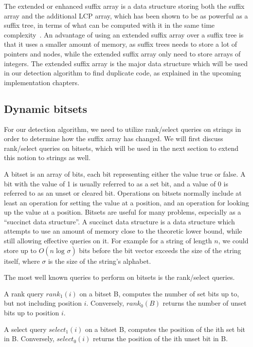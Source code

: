 The extended or enhanced suffix array is a data structure storing both the suffix array
and the additional LCP array, which has been shown to be as powerful as a suffix tree, in
terms of what can be computed with it in the same time
complexity~\cite{ReplaceSuffixTreeWithEnchancedSuffixArray}. An advantage of using an
extended suffix array over a suffix tree is that it uses a smaller amount of memory, as
suffix trees needs to store a lot of pointers and nodes, while the extended suffix array
only need to store arrays of integers. The extended suffix array is the major data
structure which will be used in our detection algorithm to find duplicate code, as
explained in the upcoming implementation chapters.



\subsection*{Dynamic bitsets}

For our detection algorithm, we need to utilize rank/select queries on strings in order to
determine how the suffix array has changed. We will first discuss rank/select queries on
bitsets, which will be used in the next section to extend this notion to strings as well.

A bitset is an array of bits, each bit representing either the value true or false. A bit
with the value of 1 is usually referred to as a set bit, and a value of 0 is referred to
as an unset or cleared bit. Operations on bitsets normally include at least an operation
for setting the value at a position, and an operation for looking up the value at a
position. Bitsets are useful for many problems, especially as a ``succinct data
structure''. A succinct data structure is a data structure which attempts to use an amount
of memory close to the theoretic lower bound, while still allowing effective queries on
it. For example for a string of length $n$, we could store up to $O(n \log_{}\sigma)$ bits
before the bit vector exceeds the size of the string itself, where $\sigma$ is the size of
the string's alphabet.

The most well known queries to perform on bitsets is the rank/select queries.

\begin{definition}

    A rank query $rank_1(i)$ on a bitset B, computes the number of set bits up to, but not
    including position $i$. Conversely, $rank_0(B)$ returns the number of unset bits up to
    position $i$.

\end{definition}
\begin{definition}
    
    A select query $select_1(i)$ on a bitset B, computes the position of the ith set bit
    in B. Conversely, $select_0(i)$ returns the position of the ith unset bit in B.

\end{definition}

